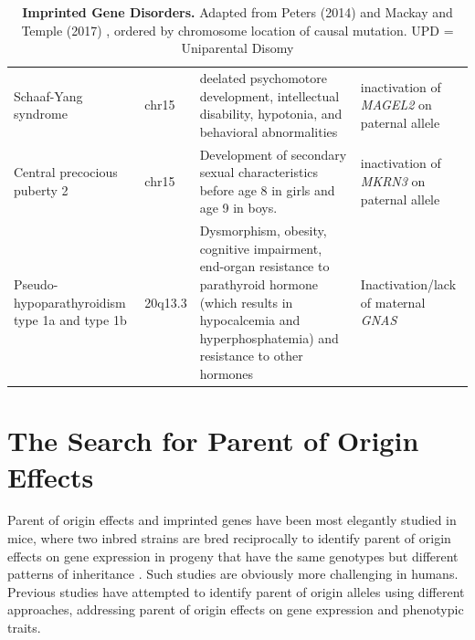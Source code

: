 \begin{table}
\begin{adjustbox}{width=1\textwidth}
\begin{tabular}{@{}p{3cm}p{2cm}p{7cm}p{7cm}@{}}
Schaaf-Yang syndrome\cite{Fountain:2017dd} & chr15  & deelated psychomotore development, intellectual disability, hypotonia, and behavioral abnormalities & inactivation of \emph{MAGEL2} on paternal allele\\
Central precocious puberty 2\cite{Abreu:2013je} & chr15 & Development of secondary sexual characteristics before age 8 in girls and age 9 in boys. & inactivation of \emph{MKRN3} on paternal allele\\
Pseudo-hypoparathyroidism type 1a and type 1b\cite{Mantovani:2016em,Elli:2016et}  & 20q13.3 & Dysmorphism, obesity, cognitive impairment, end-organ resistance to parathyroid hormone (which results in hypocalcemia and hyperphosphatemia) and resistance to other hormones & Inactivation/lack of maternal \emph{GNAS} \\ 

\bottomrule
\end{tabular}
\end{adjustbox}
\caption[Imprinted Gene Disorders.]{\textbf{Imprinted Gene Disorders.} Adapted from Peters (2014) and Mackay and Temple (2017) \cite{Peters2014,Mackay:2017kn}, ordered by chromosome location of causal mutation. UPD = Uniparental Disomy}
\label{tab:imprinteddisease}
\end{table}



\section{The Search for Parent of Origin Effects}


Parent of origin effects and imprinted genes have been most elegantly studied in mice, where two inbred strains are bred reciprocally to identify parent of origin effects on gene expression in progeny that have the same genotypes but different patterns of inheritance \cite{Babak2012}. Such studies are obviously more challenging in humans. Previous studies have attempted to identify parent of origin alleles using different approaches, addressing parent of origin effects on gene expression and phenotypic traits.

